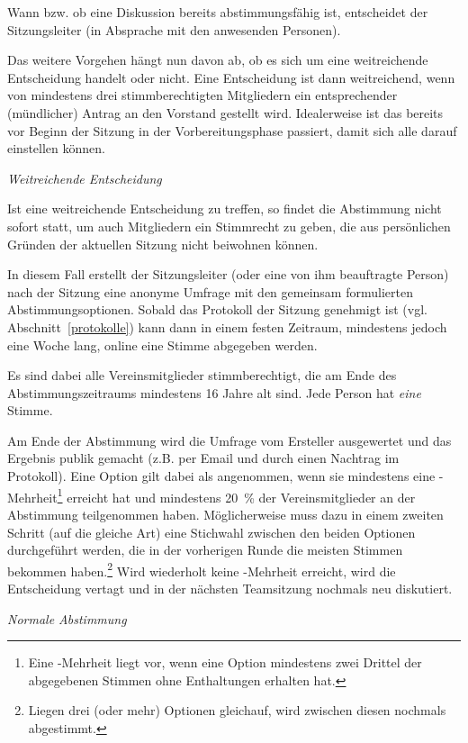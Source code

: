 \documentclass[a4 paper, 11pt]{article}
\begin{document}
Wann bzw. ob eine Diskussion bereits abstimmungsfähig ist, entscheidet der Sitzungsleiter (in Absprache mit den anwesenden Personen).

Das weitere Vorgehen hängt nun davon ab, ob es sich um eine weitreichende Entscheidung handelt oder nicht. Eine Entscheidung ist dann weitreichend, wenn von mindestens drei stimmberechtigten Mitgliedern ein entsprechender (mündlicher) Antrag an den Vorstand gestellt wird. Idealerweise ist das bereits vor Beginn der Sitzung in der Vorbereitungsphase passiert, damit sich alle darauf einstellen können.

\emph{Weitreichende Entscheidung}
\nopagebreak

Ist eine weitreichende Entscheidung zu treffen, so findet die Abstimmung nicht sofort statt, um auch Mitgliedern ein Stimmrecht zu geben, die aus persönlichen Gründen der aktuellen Sitzung nicht beiwohnen können. 

In diesem Fall erstellt der Sitzungsleiter (oder eine von ihm beauftragte Person) nach der Sitzung eine anonyme Umfrage mit den gemeinsam formulierten Abstimmungsoptionen.
Sobald das Protokoll der Sitzung genehmigt ist (vgl. Abschnitt~\ref{protokolle}) kann dann in einem festen Zeitraum, mindestens jedoch eine Woche lang, online eine Stimme abgegeben werden.

Es sind dabei alle Vereinsmitglieder stimmberechtigt, die am Ende des Abstimmungszeitraums mindestens 16 Jahre alt sind. Jede Person hat \emph{eine} Stimme.

Am Ende der Abstimmung wird die Umfrage vom Ersteller ausgewertet und das Ergebnis publik gemacht (z.B. per Email und durch einen Nachtrag im Protokoll). Eine Option gilt dabei als angenommen, wenn sie mindestens eine -Mehrheit\footnote{Eine -Mehrheit liegt vor, wenn eine Option mindestens zwei Drittel der abgegebenen Stimmen ohne Enthaltungen erhalten hat.} erreicht hat und mindestens \SI{20}{\percent} der Vereinsmitglieder an der Abstimmung teilgenommen haben. Möglicherweise muss dazu in einem zweiten Schritt (auf die gleiche Art) eine Stichwahl zwischen den beiden Optionen durchgeführt werden, die in der vorherigen Runde die meisten Stimmen bekommen haben.\footnote{\label{fo:dreiOpt} Liegen drei (oder mehr) Optionen gleichauf, wird zwischen diesen nochmals abgestimmt.} Wird wiederholt keine -Mehrheit erreicht, wird die Entscheidung vertagt und in der nächsten Teamsitzung nochmals neu diskutiert.

\emph{Normale Abstimmung}
\nopagebreak
\end{document}
